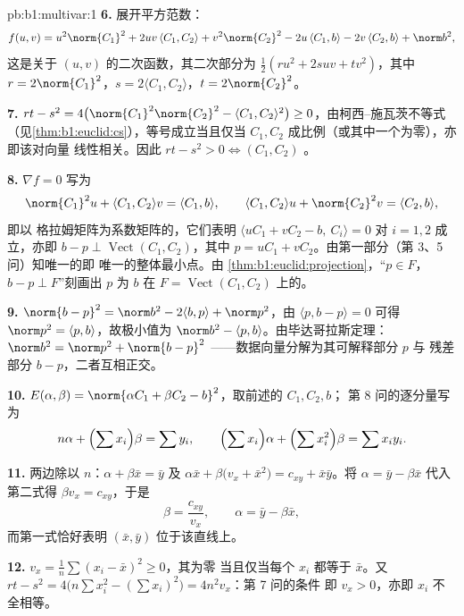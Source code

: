 \begin{solution}{pb:b1:multivar:1}
\textbf{6.} 展开平方范数：
\[
f(u,v) = u^2\norm{C_1}^2 + 2uv\,\langle C_1, C_2\rangle +
v^2\norm{C_2}^2 - 2u\,\langle C_1, b\rangle - 2v\,\langle C_2,
b\rangle + \norm b^2 ,
\]
这是关于 $(u, v)$ 的二次函数，其二次部分为
$\frac12(ru^2 + 2suv + tv^2)$，其中 $r = 2\norm{C_1}^2$，$s =
2\langle C_1, C_2\rangle$，$t = 2\norm{C_2}^2$。

\textbf{7.} $rt - s^2 = 4\bigl(\norm{C_1}^2\norm{C_2}^2 -
\langle C_1, C_2\rangle^2\bigr) \geq 0$，由柯西–施瓦茨不等式
（见\cref{thm:b1:euclid:cs}），等号成立当且仅当 $C_1, C_2$
成比例（或其中一个为零），亦即该对向量
线性相关。因此 $rt - s^2 > 0 \iff (C_1, C_2)$ 。

\textbf{8.} $\nabla f = 0$ 写为
\[
\norm{C_1}^2 u + \langle C_1, C_2\rangle v = \langle C_1,
b\rangle,
\qquad
\langle C_1, C_2\rangle u + \norm{C_2}^2 v = \langle C_2,
b\rangle,
\]
即以 格拉姆矩阵为系数矩阵的，它们表明
$\langle uC_1 + vC_2 - b,\ C_i\rangle = 0$ 对 $i = 1, 2$ 成立，亦即
$b - p \perp \operatorname{Vect}(C_1, C_2)$，其中 $p = uC_1 +
vC_2$。由第一部分（第 3、5 问）知唯一的即
唯一的整体最小点。由
\cref{thm:b1:euclid:projection}，“$p \in
F$，$b - p \perp F$”刻画出 $p$ 为
$b$ 在 $F = \operatorname{Vect}(C_1, C_2)$ 上的。

\textbf{9.} $\norm{b - p}^2 = \norm b^2 - 2\langle b, p\rangle +
\norm p^2$，由 $\langle p, b - p\rangle = 0$ 可得 $\norm p^2 =
\langle p, b\rangle$，故极小值为 $\norm b^2 - \langle p,
b\rangle$。由毕达哥拉斯定理：$\norm b^2 = \norm p^2 + \norm{b - p}^2$
——数据向量分解为其可解释部分 $p$ 与
残差部分 $b - p$，二者互相正交。

\textbf{10.} $E(\alpha, \beta) = \norm{\alpha C_1 + \beta C_2 -
b}^2$，取前述的 $C_1, C_2, b$；
第 8 问的逐分量写为
\[
n\alpha + \Bigl(\sum x_i\Bigr)\beta = \sum y_i,
\qquad
\Bigl(\sum x_i\Bigr)\alpha + \Bigl(\sum x_i^2\Bigr)\beta = \sum
x_i y_i .
\]

\textbf{11.} 两边除以 $n$：$\alpha + \beta\bar x = \bar y$
及 $\alpha\bar x + \beta\bigl(v_x + \bar x^2\bigr) = c_{xy} +
\bar x\bar y$。将 $\alpha = \bar y - \beta\bar x$ 代入
第二式得 $\beta v_x = c_{xy}$，于是
\[
\beta = \frac{c_{xy}}{v_x}, \qquad \alpha = \bar y - \beta\bar
x ,
\]
而第一式恰好表明 $(\bar x, \bar y)$
位于该直线上。

\textbf{12.} $v_x = \frac1n\sum(x_i - \bar x)^2 \geq 0$，其为零
当且仅当每个 $x_i$ 都等于 $\bar x$。又 $rt - s^2 = 4\bigl(n\sum
x_i^2 - (\sum x_i)^2\bigr) = 4n^2 v_x$：第 7 问的条件
即 $v_x > 0$，亦即 $x_i$ 不全相等。


\end{solution}
